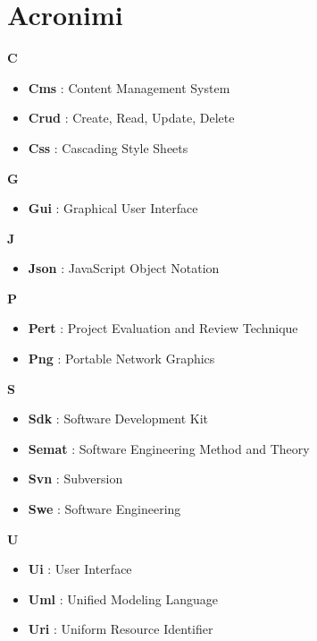 \section{Acronimi}
{\huge \textbf{C}}
\begin{flushleft}
\begin{itemize}[label={}]
\item \textbf{Cms} : Content Management System
\item \textbf{Crud} : Create, Read, Update, Delete
\item \textbf{Css} : Cascading Style Sheets
\end{itemize}
\end{flushleft}
{\huge \textbf{G}}
\begin{flushleft}
\begin{itemize}[label={}]
\item \textbf{Gui} : Graphical User Interface
\end{itemize}
\end{flushleft}
{\huge \textbf{J}}
\begin{flushleft}
\begin{itemize}[label={}]
\item \textbf{Json} : JavaScript Object Notation
\end{itemize}
\end{flushleft}
{\huge \textbf{P}}
\begin{flushleft}
\begin{itemize}[label={}]
\item \textbf{Pert} : Project Evaluation and Review Technique
\item \textbf{Png} : Portable Network Graphics
\end{itemize}
\end{flushleft}
{\huge \textbf{S}}
\begin{flushleft}
\begin{itemize}[label={}]
\item \textbf{Sdk} : Software Development Kit
\item \textbf{Semat} : Software Engineering Method and Theory
\item \textbf{Svn} : Subversion
\item \textbf{Swe} : Software Engineering
\end{itemize}
\end{flushleft}
{\huge \textbf{U}}
\begin{flushleft}
\begin{itemize}[label={}]
\item \textbf{Ui} : User Interface
\item \textbf{Uml} : Unified Modeling Language
\item \textbf{Uri} : Uniform Resource Identifier
\end{itemize}
\end{flushleft}
